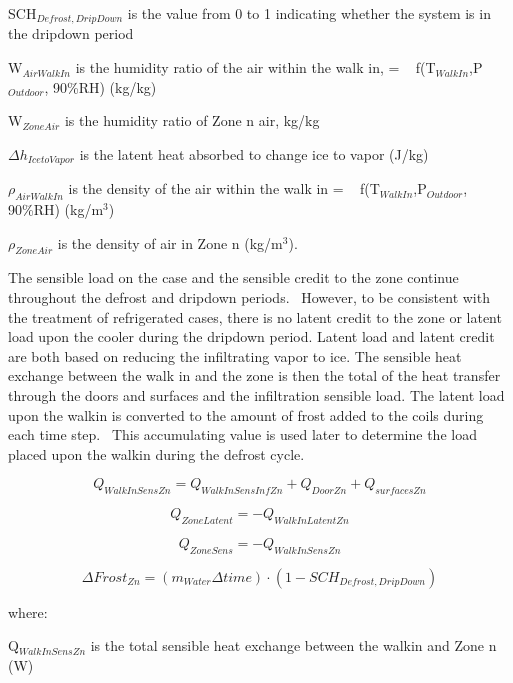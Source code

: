 SCH\(_{Defrost,DripDown}\) is the value from 0 to 1 indicating whether the system is in the dripdown period

W\(_{AirWalkIn}\) is the humidity ratio of the air within the walk in, = ~ f(T\(_{WalkIn}\),P\(_{Outdoor}\), 90\%RH) (kg/kg)

W\(_{ZoneAir}\) is the humidity ratio of Zone n air, kg/kg

\(\Delta h_{IcetoVapor}\) is the latent heat absorbed to change ice to vapor (J/kg)

\(\rho_{AirWalkIn}\) is the density of the air within the walk in = ~ f(T\(_{WalkIn}\),P\(_{Outdoor}\), 90\%RH) (kg/m\(^{3}\))

\(\rho_{ZoneAir}\) is the density of air in Zone n (kg/m\(^{3}\)).

The sensible load on the case and the sensible credit to the zone continue throughout the defrost and dripdown periods.~ However, to be consistent with the treatment of refrigerated cases, there is no latent credit to the zone or latent load upon the cooler during the dripdown period. Latent load and latent credit are both based on reducing the infiltrating vapor to ice. The sensible heat exchange between the walk in and the zone is then the total of the heat transfer through the doors and surfaces and the infiltration sensible load. The latent load upon the walkin is converted to the amount of frost added to the coils during each time step.~ This accumulating value is used later to determine the load placed upon the walkin during the defrost cycle.

\begin{equation}
Q_{WalkInSensZn} = Q_{WalkInSensInfZn} + Q_{DoorZn} + Q_{surfacesZn}
\end{equation}

\begin{equation}
Q_{ZoneLatent} = - Q_{WalkInLatentZn}
\end{equation}

\begin{equation}
Q_{ZoneSens} = - Q_{WalkInSensZn}
\end{equation}

\begin{equation}
\Delta Frost_{Zn} = (m_{Water} \Delta time) \cdot (1- SCH_{Defrost,DripDown})
\end{equation}

where:

Q\(_{WalkInSensZn}\) is the total sensible heat exchange between the walkin and Zone n (W)

